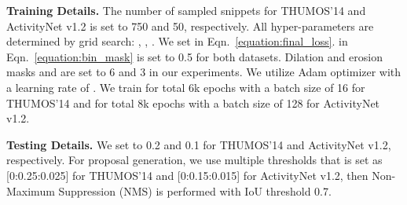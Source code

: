\documentclass[final]{cvpr}
\begin{document}
\textbf{Training Details. } The number of sampled snippets  for THUMOS’14 and ActivityNet v1.2 is set to 750 and 50, respectively. All hyper-parameters are determined by grid search: , , . We set  in Eqn.~\ref{equation:final_loss}.  in Eqn.~\ref{equation:bin_mask} is set to 0.5 for both datasets. Dilation and erosion masks  and  are set to 6 and 3 in our experiments. We utilize Adam optimizer with a learning rate of . We train for total 6k epochs with a batch size of 16 for THUMOS'14 and for total 8k epochs with a batch size of 128 for ActivityNet v1.2.

\textbf{Testing Details. } We set  to 0.2 and 0.1 for THUMOS’14 and ActivityNet v1.2, respectively. For proposal generation, we use multiple thresholds that  is set as [0:0.25:0.025] for THUMOS'14 and [0:0.15:0.015] for ActivityNet v1.2, then Non-Maximum Suppression (NMS) is performed with IoU threshold 0.7.
\end{document}
